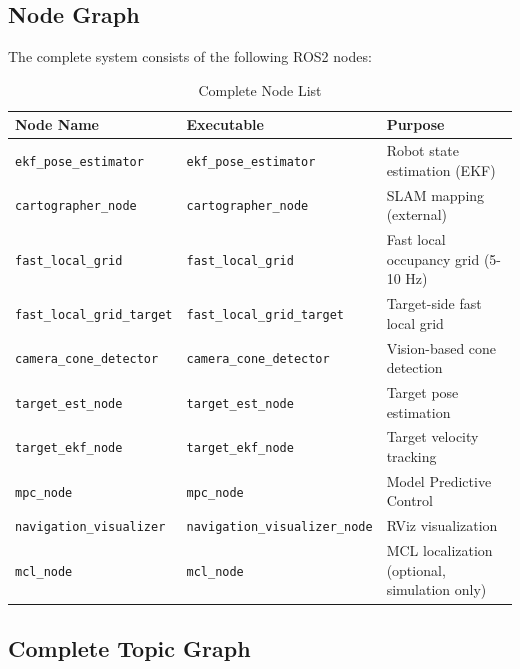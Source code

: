 \documentclass[11pt]{article}
\begin{document}
\subsection{Node Graph}

The complete system consists of the following ROS2 nodes:

\begin{table}[H]
\centering
\caption{Complete Node List}
\begin{tabular}{|l|l|l|}
\hline
\textbf{Node Name} & \textbf{Executable} & \textbf{Purpose} \\
\hline
\texttt{ekf\_pose\_estimator} & \texttt{ekf\_pose\_estimator} & Robot state estimation (EKF) \\
\texttt{cartographer\_node} & \texttt{cartographer\_node} & SLAM mapping (external) \\
\texttt{fast\_local\_grid} & \texttt{fast\_local\_grid} & Fast local occupancy grid (5-10 Hz) \\
\texttt{fast\_local\_grid\_target} & \texttt{fast\_local\_grid\_target} & Target-side fast local grid \\
\texttt{camera\_cone\_detector} & \texttt{camera\_cone\_detector} & Vision-based cone detection \\
\texttt{target\_est\_node} & \texttt{target\_est\_node} & Target pose estimation \\
\texttt{target\_ekf\_node} & \texttt{target\_ekf\_node} & Target velocity tracking \\
\texttt{mpc\_node} & \texttt{mpc\_node} & Model Predictive Control \\
\texttt{navigation\_visualizer} & \texttt{navigation\_visualizer\_node} & RViz visualization \\
\texttt{mcl\_node} & \texttt{mcl\_node} & MCL localization (optional, simulation only) \\
\hline
\end{tabular}
\end{table}

\subsection{Complete Topic Graph}
\end{document}
